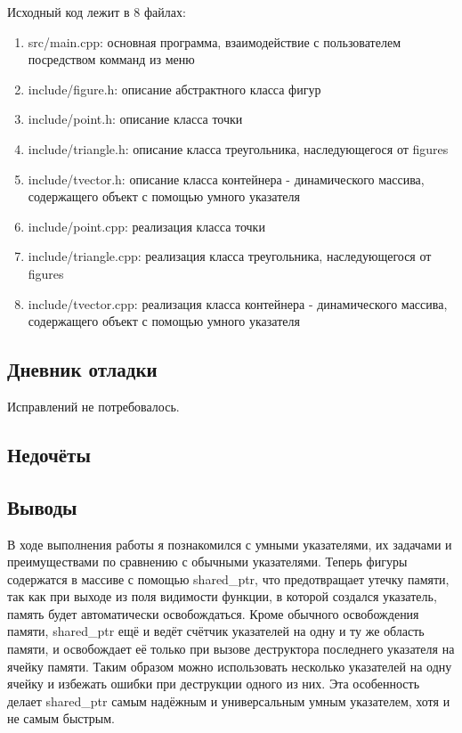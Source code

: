 \documentclass[12pt]{article}
\begin{document}
Исходный код лежит в 8 файлах:
\begin{enumerate}
\item src/main.cpp: основная программа, взаимодействие с пользователем посредством комманд из меню

\item include/figure.h:    описание абстрактного класса фигур

\item include/point.h:     описание класса точки
\item include/triangle.h:  описание класса треугольника, наследующегося от figures
\item include/tvector.h:     описание класса контейнера - динамического массива, содержащего объект с помощью умного указателя

\item include/point.cpp:     реализация класса точки
\item include/triangle.cpp:  реализация класса треугольника, наследующегося от figures
\item include/tvector.cpp: реализация класса контейнера - динамического массива, содержащего объект с помощью умного указателя

\end{enumerate}

\subsection*{Дневник отладки}
Исправлений не потребовалось.


\subsection*{Недочёты}


\subsection*{Выводы}
В ходе выполнения работы я познакомился с умными указателями, их задачами и преимуществами по сравнению с обычными указателями.\newline
Теперь фигуры содержатся в массиве с помощью shared\_ptr, что предотвращает утечку памяти, так как при выходе из поля видимости функции, в которой создался указатель, память будет автоматически освобождаться. Кроме обычного освобождения памяти, shared\_ptr ещё и ведёт счётчик указателей на одну и ту же область памяти, и освобождает её только при вызове деструктора последнего указателя на ячейку памяти. Таким образом можно использовать несколько указателей на одну ячейку и избежать ошибки при деструкции одного из них. Эта особенность делает shared\_ptr самым надёжным и универсальным умным указателем, хотя и не самым быстрым.
\end{document}
